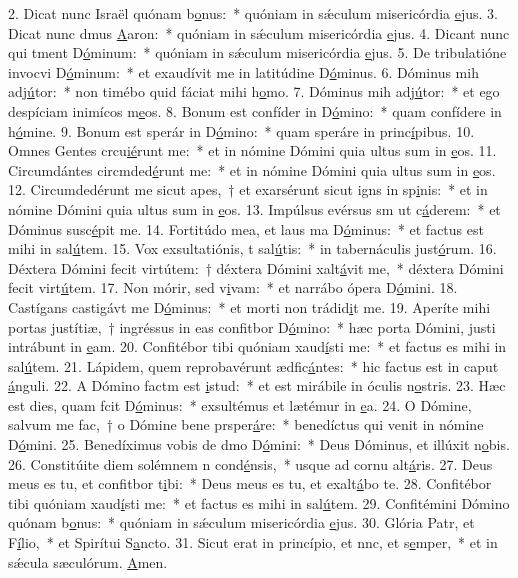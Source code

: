 2. Dicat nunc Israël quónam b\uline{o}nus:~* quóniam in sǽculum misericórdia \uline{e}jus.
3. Dicat nunc dmus \uline{A}aron:~* quóniam in sǽculum misericórdia \uline{e}jus.
4. Dicant nunc qui tment D\uline{ó}minum:~* quóniam in sǽculum misericórdia \uline{e}jus.
5. De tribulatióne invocvi D\uline{ó}minum:~* et exaudívit me in latitúdine D\uline{ó}minus.
6. Dóminus mih adj\uline{ú}tor:~* non timébo quid fáciat mihi h\uline{o}mo.
7. Dóminus mih adj\uline{ú}tor:~* et ego despíciam inimícos m\uline{e}os.
8. Bonum est confíder in D\uline{ó}mino:~* quam confídere in h\uline{ó}mine.
9. Bonum est sperár in D\uline{ó}mino:~* quam speráre in princ\uline{í}pibus.
10. Omnes Gentes crcu\uline{ié}runt me:~* et in nómine Dómini quia ultus sum in \uline{e}os.
11. Circumdántes circmded\uline{é}runt me:~* et in nómine Dómini quia ultus sum in \uline{e}os.
12. Circumdedérunt me sicut apes,~† et exarsérunt sicut igns in sp\uline{i}nis:~* et in nómine Dómini quia ultus sum in \uline{e}os.
13. Impúlsus evérsus sm ut c\uline{á}derem:~* et Dóminus susc\uline{é}pit me.
14. Fortitúdo mea, et laus ma D\uline{ó}minus:~* et factus est mihi in sal\uline{ú}tem.
15. Vox exsultatiónis, t sal\uline{ú}tis:~* in tabernáculis just\uline{ó}rum.
16. Déxtera Dómini fecit virtútem:~† déxtera Dómini xalt\uline{á}vit me,~* déxtera Dómini fecit virt\uline{ú}tem.
17. Non mórir, sed v\uline{i}vam:~* et narrábo ópera D\uline{ó}mini.
18. Castígans castigávt me D\uline{ó}minus:~* et morti non trádid\uline{i}t me.
19. Aperíte mihi portas justítiæ,~† ingréssus in eas confitbor D\uline{ó}mino:~* hæc porta Dómini, justi intrábunt in \uline{e}am.
20. Confitébor tibi quóniam xaud\uline{í}sti me:~* et factus es mihi in sal\uline{ú}tem.
21. Lápidem, quem reprobavérunt ædfic\uline{á}ntes:~* hic factus est in caput \uline{á}nguli.
22. A Dómino factm est \uline{i}stud:~* et est mirábile in óculis n\uline{o}stris.
23. Hæc est dies, quam fcit D\uline{ó}minus:~* exsultémus et lætémur in \uline{e}a.
24. O Dómine, salvum me fac,~† o Dómine bene prsper\uline{á}re:~* benedíctus qui venit in nómine D\uline{ó}mini.
25. Benedíximus vobis de dmo D\uline{ó}mini:~* Deus Dóminus, et illúxit n\uline{o}bis.
26. Constitúite diem solémnem n cond\uline{é}nsis,~* usque ad cornu alt\uline{á}ris.
27. Deus meus es tu, et confitbor t\uline{i}bi:~* Deus meus es tu, et exalt\uline{á}bo te.
28. Confitébor tibi quóniam xaud\uline{í}sti me:~* et factus es mihi in sal\uline{ú}tem.
29. Confitémini Dómino quónam b\uline{o}nus:~* quóniam in sǽculum misericórdia \uline{e}jus.
30. Glória Patr, et F\uline{í}lio,~* et Spirítui S\uline{a}ncto.
31. Sicut erat in princípio, et nnc, et s\uline{e}mper,~* et in sǽcula sæculórum. \uline{A}men.
